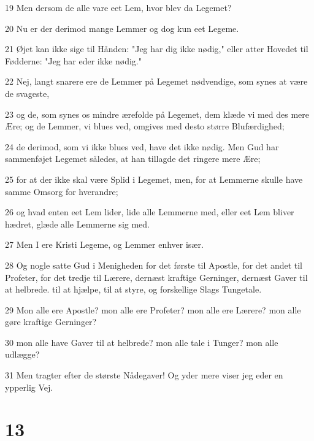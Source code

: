 \par 19 Men dersom de alle vare eet Lem, hvor blev da Legemet?
\par 20 Nu er der derimod mange Lemmer og dog kun eet Legeme.
\par 21 Øjet kan ikke sige til Hånden: "Jeg har dig ikke nødig," eller atter Hovedet til Fødderne: "Jeg har eder ikke nødig."
\par 22 Nej, langt snarere ere de Lemmer på Legemet nødvendige, som synes at være de svageste,
\par 23 og de, som synes os mindre ærefolde på Legemet, dem klæde vi med des mere Ære; og de Lemmer, vi blues ved, omgives med desto større Blufærdighed;
\par 24 de derimod, som vi ikke blues ved, have det ikke nødig. Men Gud har sammenføjet Legemet således, at han tillagde det ringere mere Ære;
\par 25 for at der ikke skal være Splid i Legemet, men, for at Lemmerne skulle have samme Omsorg for hverandre;
\par 26 og hvad enten eet Lem lider, lide alle Lemmerne med, eller eet Lem bliver hædret, glæde alle Lemmerne sig med.
\par 27 Men I ere Kristi Legeme, og Lemmer enhver især.
\par 28 Og nogle satte Gud i Menigheden for det første til Apostle, for det andet til Profeter, for det tredje til Lærere, dernæst kraftige Gerninger, dernæst Gaver til at helbrede. til at hjælpe, til at styre, og forskellige Slags Tungetale.
\par 29 Mon alle ere Apostle? mon alle ere Profeter? mon alle ere Lærere? mon alle gøre kraftige Gerninger?
\par 30 mon alle have Gaver til at helbrede? mon alle tale i Tunger? mon alle udlægge?
\par 31 Men tragter efter de største Nådegaver! Og yder mere viser jeg eder en ypperlig Vej.

\chapter{13}

